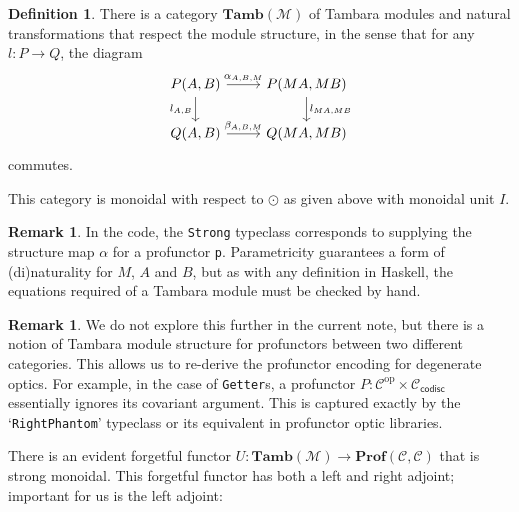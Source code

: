 \documentclass[11pt,letterpaper]{article}
\theoremstyle{plain}
\theoremstyle{definition}
\newtheorem{definition}[theorem]{Definition}
\newtheorem{remark}[theorem]{Remark}
\newcommand{\C}{\mathscr{C}}
\newcommand{\M}{\mathscr{M}}
\newcommand{\Prof}{\mathbf{Prof}}
\newcommand{\Tamb}{\mathbf{Tamb}}
\newcommand{\op}{\mathrm{op}}
\begin{document}
\begin{definition}
  There is a category $\Tamb(\M)$ of Tambara modules and natural transformations that respect the module structure, in the sense that for any $l : P \to Q$, the diagram
  \[
    \begin{tikzcd}
      P(A,B) \ar[r, "\alpha_{A,B,M}"] \ar[d, "l_{A,B}" left] & P(MA, MB) \ar[d, "l_{MA, MB}" right] \\
      Q(A,B) \ar[r, "\beta_{A,B,M}"] & Q(MA, MB)
    \end{tikzcd}
  \]
  commutes.
\end{definition}

This category is monoidal with respect to $\odot$ as given above with monoidal unit $I$.

\begin{remark}
  In the code, the \texttt{Strong} typeclass corresponds to supplying the structure map $\alpha$ for a profunctor \texttt{p}. Parametricity guarantees a form of (di)naturality for $M$, $A$ and $B$, but as with any definition in Haskell, the equations required of a Tambara module must be checked by hand.
\end{remark}

\begin{remark}
We do not explore this further in the current note, but there is a notion of Tambara module structure for profunctors between two different categories. This allows us to re-derive the profunctor encoding for degenerate optics. For example, in the case of \texttt{Getter}s, a profunctor $P : \C^\op \times \C_\mathsf{codisc}$ essentially ignores its covariant argument. This is captured exactly by the `\texttt{RightPhantom}' typeclass or its equivalent in profunctor optic libraries.
\end{remark}

There is an evident forgetful functor $U : \Tamb(\M) \to \Prof(\C, \C)$ that is strong monoidal. This forgetful functor has both a left and right adjoint; important for us is the left adjoint:
\end{document}
